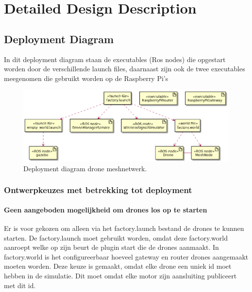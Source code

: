 \documentclass[a4paper, 11pt, oneside]{report}
\begin{document}
\chapter{Detailed Design Description}
\label{DetailedDesign}

\section{Deployment Diagram}
\label{DetailedDesign:deployment}
In dit deployment diagram staan de executables (Ros nodes) die opgestart worden door de verschillende launch files, daarnaast zijn ook de twee executables meegenomen die gebruikt worden op de Raspberry Pi's

\begin{figure}[H]
	\begin{center}\includegraphics[width=\linewidth]{UML/out/DeploymentDiagram/DeploymentDiagram/DeploymentDiagram.png}\end{center}
	\caption{Deployment diagram drone meshnetwerk.}
	\label{fig:deploymentdiagram}
\end{figure}

\subsection{Ontwerpkeuzes met betrekking tot deployment}
\label{DetailedDesign:deployment:decisisions}

\subsubsection{Geen aangeboden mogelijkheid om drones los op te starten}
Er is voor gekozen om alleen via het factory.launch bestand de drones te kunnen starten. 
De factory.launch moet gebruikt worden, omdat deze factory.world aanroept welke op zijn beurt de plugin start die de drones aanmaakt.  
In factory.world is het configureerbaar hoeveel gateway en router drones aangemaakt moeten worden.
Deze keuze is gemaakt, omdat elke drone een uniek id moet hebben in de simulatie. Dit moet omdat elke motor zijn aansluiting publiceert met dit id.
\end{document}
